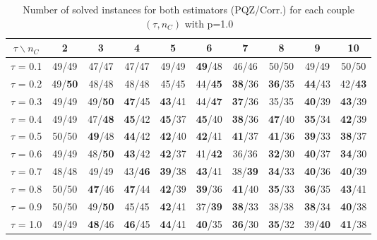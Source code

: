 \begin{table}[H]
\centering
\begin{tabular}{|c|c|c|c|c|c|c|c|c|c|}
\hline
$\tau \backslash n_C$  & 2 & 3 & 4 & 5 & 6 & 7 & 8 & 9 & 10 \\
\hline
$\tau$ = 0.1 &  49/49 & 47/47 & 47/47 & 49/49 & \textbf{49}/48 & 46/46 & 50/50 & 49/49 & 50/50 \\
\hline
$\tau$ = 0.2 &  49/\textbf{50} & 48/48 & 48/48 & 45/45 & 44/\textbf{45} & \textbf{38}/36 & \textbf{36}/35 & \textbf{44}/43 & 42/\textbf{43} \\
\hline
$\tau$ = 0.3 &  49/49 & 49/\textbf{50} & \textbf{47}/45 & \textbf{43}/41 & 44/\textbf{47} & \textbf{37}/36 & 35/35 & \textbf{40}/39 & \textbf{43}/39 \\
\hline
$\tau$ = 0.4 &  49/49 & 47/\textbf{48} & \textbf{45}/42 & \textbf{45}/37 & \textbf{45}/40 & \textbf{38}/36 & \textbf{47}/40 & \textbf{35}/34 & \textbf{42}/39 \\
\hline
$\tau$ = 0.5 &  50/50 & \textbf{49}/48 & \textbf{44}/42 & \textbf{42}/40 & \textbf{42}/41 & \textbf{41}/37 & \textbf{41}/36 & \textbf{39}/33 & \textbf{38}/37 \\
\hline
$\tau$ = 0.6 & 49/49 & 48/\textbf{50} & \textbf{43}/42 & \textbf{42}/37 & 41/\textbf{42} & 36/36 & \textbf{32}/30 & \textbf{40}/37 & \textbf{34}/30 \\
\hline
$\tau$ = 0.7 &  48/48 & 49/49 & 43/\textbf{46} & \textbf{39}/38 & \textbf{43}/41 & 38/\textbf{39} & \textbf{34}/33 & \textbf{40}/36 & \textbf{40}/39 \\
\hline
$\tau$ = 0.8 &  50/50 & \textbf{47}/46 & \textbf{47}/44 & \textbf{42}/39 & \textbf{39}/36 & \textbf{41}/40 & \textbf{35}/33 & \textbf{36}/35 & \textbf{43}/41 \\
\hline
$\tau$ = 0.9 &  50/50 & 49/\textbf{50} & 45/45 & \textbf{42}/41 & 37/\textbf{39} & \textbf{38}/33 & 38/38 & \textbf{38}/34 & \textbf{40}/38 \\
\hline
$\tau$ = 1.0 &  49/49 & \textbf{48}/46 & \textbf{46}/45 & \textbf{44}/41 & \textbf{40}/35 & \textbf{36}/30 & \textbf{35}/32 & 39/\textbf{40} & \textbf{41}/38 \\
\hline
\end{tabular}

~	\caption{Number of solved instances for both estimators (PQZ/Corr.) for each couple $(\tau, n_C)$ with p=1.0}
    \label{nbSolved1}
\end{table}